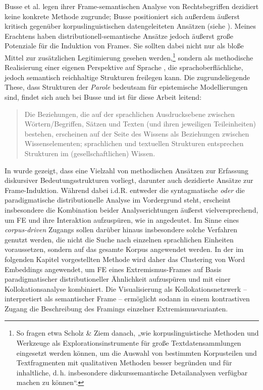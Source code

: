 Busse et al. \autocite*{busseBedeutungsUndBegriffswissen2018} legen ihrer Frame-semantischen Analyse von Rechtsbegriffen dezidiert keine konkrete Methode zugrunde; Busse positioniert sich außerdem äußerst kritisch gegenüber korpuslinguistischen datengeleiteten Ansätzen (siehe ). Meines Erachtens haben distributionell-semantische Ansätze jedoch äußerst große Potenziale für die Induktion von Frames. Sie sollten dabei nicht nur als bloße Mittel zur zusätzlichen Legitimierung gesehen werden,\footnote{So fragen etwa Scholz \& Ziem \autocite*[282]{scholzVokabularImDiskurshistorischen2015} danach, „wie korpuslinguistische Methoden und Werkzeuge als Explorationsinstrumente für große Textdatensammlungen eingesetzt werden können, um die Auswahl von bestimmten Korpusteilen und Textfragmenten mit qualitativen Methoden besser begründen und für inhaltliche, d.\,h. insbesondere diskurssemantische Detailanalysen verfügbar machen zu können``.} sondern als methodische Realisierung einer eigenen Perspektive auf Sprache \autocite{tognini-bonelliCorpusLinguisticsWork2001, perkuhnKorpuslinguistikUnbekannteWesen2006, bubenhoferKorpuslinguistischeDiskursanalyseNutzen2013}, die sprachoberflächliche, jedoch semantisch reichhaltige Strukturen freilegen kann. Die zugrundeliegende These, dass Strukturen der \emph{Parole} bedeutsam für epistemische Modellierungen sind, findet sich auch bei Busse und ist für diese Arbeit leitend:

\begin{quote}
Die Beziehungen, die auf der sprachlichen Ausdrucksebene zwischen Wörtern{\slash}Begriffen, Sätzen und Texten (und ihren jeweiligen Teileinheiten) bestehen, erscheinen auf der Seite des Wissens als Beziehungen zwischen Wissenselementen; sprachlichen und textuellen Strukturen entsprechen Strukturen im (gesellschaftlichen) Wissen. \autocite[164]{busseDiskursSpracheGesellschaftliches2013}
\end{quote}

In  wurde gezeigt, dass eine Vielzahl von methodischen Ansätzen zur Erfassung diskursiver Bedeutungsstrukturen vorliegt, darunter auch dezidierte Ansätze zur Frame-Induktion. Während dabei i.d.R. entweder die syntagmatische \emph{oder} die paradigmatische distributionelle Analyse im Vordergrund steht, erscheint insbesondere die Kombination beider Analyserichtungen äußerst vielversprechend, um FE und ihre Interaktion aufzuspüren, wie in  angedeutet. Im Sinne eines \emph{corpus-driven} Zugangs sollen darüber hinaus insbesondere solche Verfahren genutzt werden, die nicht die Suche nach einzelnen sprachlichen Einheiten voraussetzen, sondern auf das gesamte Korpus angewendet werden. In der im folgenden Kapitel vorgestellten Methode wird daher das Clustering von Word Embeddings angewendet, um FE eines Extremismus-Frames auf Basis paradigmatischer distributioneller Ähnlichkeit aufzuspüren und mit einer Kollokationsanalyse kombiniert. Die Visualisierung als Kollokationsnetzwerk -- interpretiert als semantischer Frame -- ermöglicht sodann in einem kontrastiven Zugang die Beschreibung des Framings einzelner Extremismusvarianten.

